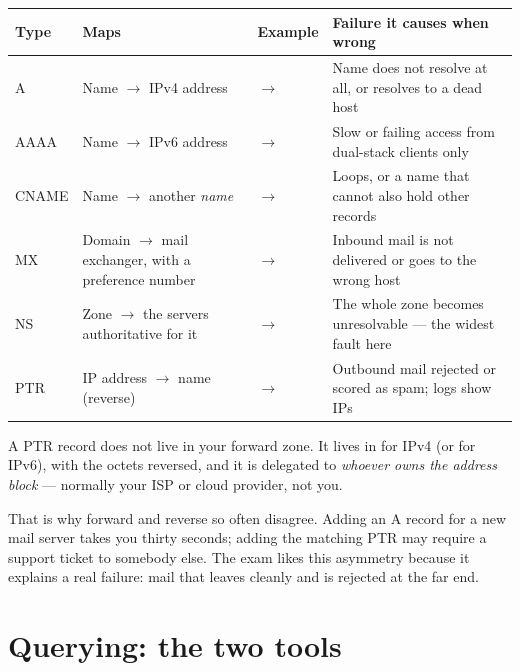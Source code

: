 \begin{longtable}{@{}L{1.5cm}L{4.3cm}L{4.3cm}L{4.8cm}@{}}
\toprule
{}
\textbf{Type} & \textbf{Maps} & \textbf{Example} & \textbf{Failure it causes when wrong} \\
\midrule
\endhead
A & Name $\rightarrow$ IPv4 address &
 $\rightarrow$  &
Name does not resolve at all, or resolves to a dead host \\
AAAA & Name $\rightarrow$ IPv6 address &
 $\rightarrow$  &
Slow or failing access from dual-stack clients only \\
CNAME & Name $\rightarrow$ another \emph{name} &
 $\rightarrow$  &
Loops, or a name that cannot also hold other records \\
MX & Domain $\rightarrow$ mail exchanger, with a preference number &
 $\rightarrow$  &
Inbound mail is not delivered or goes to the wrong host \\
NS & Zone $\rightarrow$ the servers authoritative for it &
 $\rightarrow$  &
The whole zone becomes unresolvable --- the widest fault here \\
PTR & IP address $\rightarrow$ name (reverse) &
 $\rightarrow$  &
Outbound mail rejected or scored as spam; logs show IPs \\
\bottomrule
\end{longtable}

\begin{conceptbox}
A PTR record does not live in your forward zone. It lives in 
for IPv4 (or  for IPv6), with the octets reversed, and it is
delegated to \emph{whoever owns the address block} --- normally your ISP or
cloud provider, not you.

That is why forward and reverse so often disagree. Adding an A record for a new
mail server takes you thirty seconds; adding the matching PTR may require a
support ticket to somebody else. The exam likes this asymmetry because it
explains a real failure: mail that leaves cleanly and is rejected at the far end.
\end{conceptbox}

\section{Querying: the two tools}

